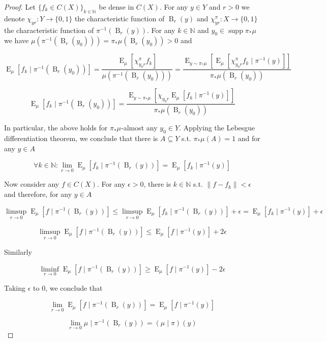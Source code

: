 \documentclass[11pt]{article}
\theoremstyle{definition}
\theoremstyle{plain}
\newcommand{\Nats}{\mathbb{N}}
\newcommand{\N}[1]{\lVert #1 \rVert}
\newcommand{\Sq}[2]{\{#1\}_{#2 \in \Nats}}
\newcommand{\B}{\operatorname{B}}
\DeclareMathOperator{\E}{E}
\DeclareMathOperator{\Sp}{supp}
\begin{document}
\begin{proof}

Let $\Sq{f_k \in C\left(X\right)}{k}$ be dense in $C\left(X\right)$. For any $y \in Y$ and $r > 0$ we denote $\chi_{yr}: Y \rightarrow \{0,1\}$ the characteristic function of $\B_r\left(y\right)$ and $\chi^\pi_{yr}: X \rightarrow \{0,1\}$ the characteristic function of $\pi^{-1}\left(\B_r\left(y\right)\right)$. For any $k \in \Nats$ and $y_0 \in \Sp \pi_* \mu$ we have $\mu\left(\pi^{-1}\left(\B_r\left(y_0\right)\right)\right) = \pi_*\mu\left(\B_r\left(y_0\right)\right) > 0$ and

$$\E_{\mu}\left[f_k \mid \pi^{-1}\left(\B_r\left(y_0\right)\right)\right] = \frac{\E_{\mu}\left[\chi^\pi_{y_0r} f_k\right]}{\mu\left(\pi^{-1}\left(\B_r\left(y_0\right)\right)\right)} = \frac{\E_{y \sim \pi_* \mu}\left[\E_{\mu}\left[\chi^\pi_{y_0r} f_k \mid \pi^{-1}\left(y\right)\right]\right]}{\pi_*\mu\left(\B_r\left(y_0\right)\right)}$$

$$\E_{\mu}\left[f_k \mid \pi^{-1}\left(\B_r\left(y_0\right)\right)\right] = \frac{\E_{y \sim \pi_* \mu}\left[\chi_{y_0r} \E_{\mu}\left[f_k \mid \pi^{-1}\left(y\right)\right]\right]}{\pi_*\mu\left(\B_r\left(y_0\right)\right)}$$

In particular, the above holds for $\pi_* \mu$-almost any $y_0 \in Y$. Applying the Lebesgue differentiation theorem, we conclude that there is $A \subseteq Y$ s.t. $\pi_*\mu\left(A\right) = 1$ and for any $y \in A$

$$\forall k \in \Nats: \lim_{r \rightarrow 0} \E_{\mu}\left[f_k \mid \pi^{-1}\left(\B_r\left(y\right)\right)\right] = \E_{\mu}\left[f_k \mid \pi^{-1}\left(y\right)\right]$$

Now consider any $f \in C\left(X\right)$. For any $\epsilon > 0$, there is $k \in \Nats$ s.t. $\N{f-f_k} < \epsilon$ and therefore, for any $y \in A$

$$\limsup_{r \rightarrow 0} \E_{\mu}\left[f \mid \pi^{-1}\left(\B_r\left(y\right)\right)\right] \leq \limsup_{r \rightarrow 0} \E_{\mu}\left[f_k \mid \pi^{-1}\left(\B_r\left(y\right)\right)\right] + \epsilon = \E_{\mu}\left[f_k \mid \pi^{-1}\left(y\right)\right] + \epsilon  $$

$$\limsup_{r \rightarrow 0} \E_{\mu}\left[f \mid \pi^{-1}\left(\B_r\left(y\right)\right)\right] \leq \E_{\mu}\left[f \mid \pi^{-1}\left(y\right)\right] + 2\epsilon$$

Similarly

$$\liminf_{r \rightarrow 0} \E_{\mu}\left[f \mid \pi^{-1}\left(\B_r\left(y\right)\right)\right] \geq \E_{\mu}\left[f \mid \pi^{-1}\left(y\right)\right] - 2\epsilon$$

Taking $\epsilon$ to 0, we conclude that

$$\lim_{r \rightarrow 0} \E_{\mu}\left[f \mid \pi^{-1}\left(\B_r\left(y\right)\right)\right] = \E_{\mu}\left[f \mid \pi^{-1}\left(y\right)\right]$$

$$\lim_{r \rightarrow 0} \mu \mid \pi^{-1}\left(\B_r\left(y\right)\right) = \left(\mu \mid \pi\right)\left(y\right)$$
\end{proof}
\end{document}
